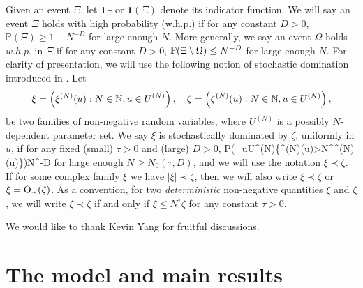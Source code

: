 Given an event $\Xi$, let $\mathbf 1_\Xi$ or $\mathbf 1(\Xi)$ denote its indicator function. We will say an event $\Xi$ holds with high probability (w.h.p.) if for any constant $D>0$, $\mathbb P(\Xi)\ge 1- N^{-D}$ for large enough $N$. More generally, we say an event $\Omega$ holds $w.h.p.$ in $\Xi$ if for any constant $D>0$, $\P( \Xi\setminus \Omega)\le N^{-D}$ for large enough $N$. 
For clarity of presentation, we will use the following notion of stochastic domination introduced in \cite{Average_fluc}. %
Let \[\xi=\left(\xi^{(N)}(u):N\in\mathbb N, u\in U^{(N)}\right),\hskip 10pt \zeta=\left(\zeta^{(N)}(u):N\in\mathbb N, u\in U^{(N)}\right),\]
	be two families of non-negative random variables, where $U^{(N)}$ is a possibly $N$-dependent parameter set. We say $\xi$ is stochastically dominated by $\zeta$, uniformly in $u$, if for any fixed (small) $\tau>0$ and (large) $D>0$, 
	\be\label{stoch_domination}\mathbb P\bigg(\bigcup_{u\in U^{(N)}}\left\{\xi^{(N)}(u)>N^\tau\zeta^{(N)}(u)\right\}\bigg)\le N^{-D}\ee
	for large enough $N\ge N_0(\tau, D)$, and we will use the notation $\xi\prec\zeta$. 
		If for some complex family $\xi$ we have $|\xi|\prec\zeta$, then we will also write $\xi \prec \zeta$ or $\xi=\OO_\prec(\zeta)$. 
    As a convention, for two \emph{deterministic} non-negative quantities $\xi$ and $\zeta$, we will write $\xi\prec\zeta$ if and only if $\xi\le N^\tau \zeta$ for any constant $\tau>0$. 

	
    

\medskip
{}   
We would like to thank Kevin Yang for fruitful discussions.


\section{The model and main results}\label{sec_model-results}


